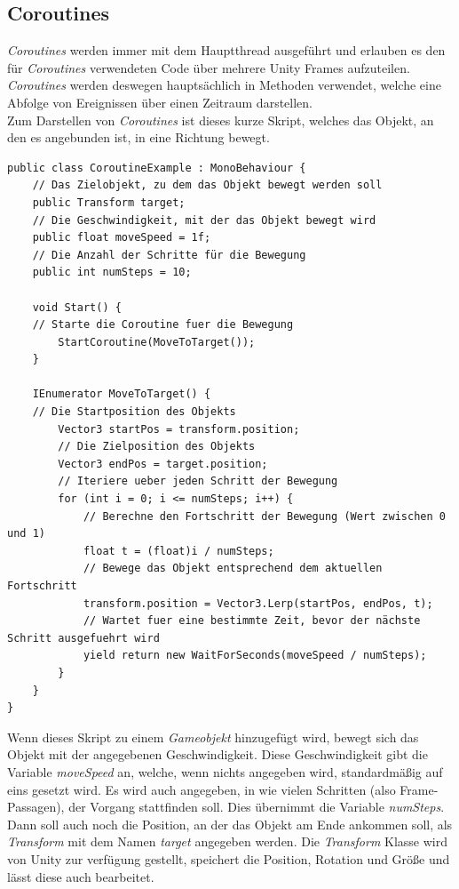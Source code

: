 \subsection{\label{sec:Coroutines}Coroutines}
\textit{Coroutines} werden immer mit dem Hauptthread ausgeführt und erlauben es den für \textit{Coroutines} verwendeten Code über mehrere Unity Frames aufzuteilen. \textit{Coroutines} werden deswegen hauptsächlich in Methoden verwendet, welche eine Abfolge von Ereignissen über einen Zeitraum darstellen.
\\
Zum Darstellen von \textit{Coroutines} ist dieses kurze Skript, welches das Objekt, an den es angebunden ist, in eine Richtung bewegt.
\begin{lstlisting}[style=csharp, caption={Coroutine Beispiel}, label={code:coroutineBsp}]
public class CoroutineExample : MonoBehaviour {
    // Das Zielobjekt, zu dem das Objekt bewegt werden soll
    public Transform target;
    // Die Geschwindigkeit, mit der das Objekt bewegt wird
    public float moveSpeed = 1f;
    // Die Anzahl der Schritte für die Bewegung
    public int numSteps = 10;

    void Start() {
    // Starte die Coroutine fuer die Bewegung
        StartCoroutine(MoveToTarget());
    }

    IEnumerator MoveToTarget() {
    // Die Startposition des Objekts
        Vector3 startPos = transform.position;
        // Die Zielposition des Objekts
        Vector3 endPos = target.position;
        // Iteriere ueber jeden Schritt der Bewegung
        for (int i = 0; i <= numSteps; i++) {
            // Berechne den Fortschritt der Bewegung (Wert zwischen 0 und 1)
            float t = (float)i / numSteps;
            // Bewege das Objekt entsprechend dem aktuellen Fortschritt
            transform.position = Vector3.Lerp(startPos, endPos, t);
            // Wartet fuer eine bestimmte Zeit, bevor der nächste Schritt ausgefuehrt wird
            yield return new WaitForSeconds(moveSpeed / numSteps);
        }
    }
}
\end{lstlisting}
Wenn dieses Skript zu einem \textit{Gameobjekt} hinzugefügt wird, bewegt sich das Objekt mit der angegebenen Geschwindigkeit. Diese Geschwindigkeit gibt die Variable \textit{moveSpeed} an, welche, wenn nichts angegeben wird, standardmäßig auf eins gesetzt wird. Es wird auch angegeben, in wie vielen Schritten (also Frame-Passagen), der Vorgang stattfinden soll. Dies übernimmt die Variable \textit{numSteps}. Dann soll auch noch die Position, an der das Objekt am Ende ankommen soll, als \textit{Transform} mit dem Namen \textit{target} angegeben werden. Die \textit{Transform} Klasse wird von Unity zur verfügung gestellt,  speichert die Position, Rotation und Größe und lässt diese auch bearbeitet. \\
